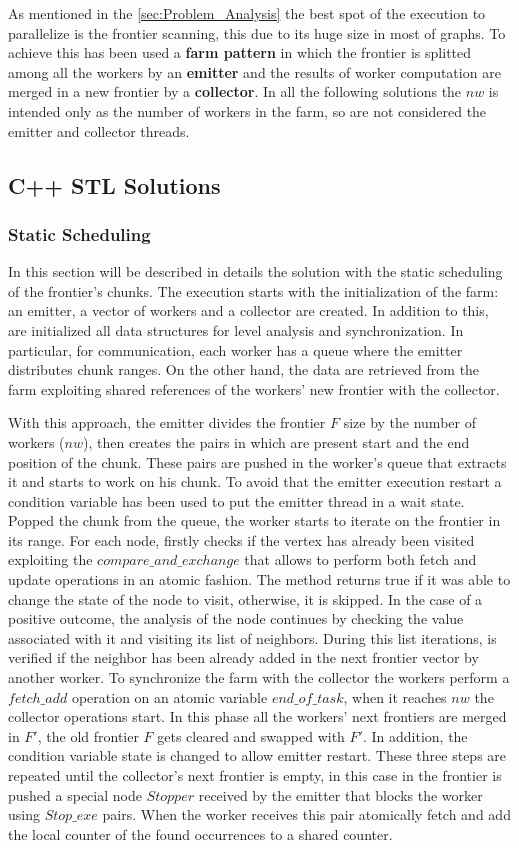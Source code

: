 As mentioned in the \ref{sec:Problem_Analysis} the best spot of the execution to parallelize is the frontier scanning, this due to its huge size in most of graphs. To achieve this has been used a \textbf{farm pattern} in which the frontier is splitted among all the workers by an \textbf{emitter} and the results of worker computation are merged in a new frontier by a \textbf{collector}.
In all the following solutions the $nw$ is intended only as the number of workers in the farm, so are not considered the emitter and collector threads.
\subsection{C++ STL Solutions}
\label{subsec:CStatic}
\subsubsection{Static Scheduling}
In this section will be described in details the solution with the static scheduling of the frontier's chunks.
The execution starts with the initialization of the farm: an emitter, a vector of workers and a collector are created. In addition to this, are initialized all data structures for level analysis and synchronization. In particular, for communication, each worker has a queue where the emitter distributes chunk ranges. On the other hand, the data are retrieved from the farm exploiting shared references of the workers' new frontier with the collector.

With this approach, the emitter divides the frontier $F$ size by the number of workers ($nw$), then creates the pairs in which are present start and the end position of the chunk. These pairs are pushed in the worker's queue that extracts it and starts to work on his chunk. To avoid that the emitter execution restart a condition variable has been used to put the emitter thread in a wait state. 
Popped the chunk from the queue, the worker starts to iterate on the frontier in its range. For each node, firstly checks if the vertex has already been visited exploiting the $compare\_and\_exchange$ that allows to perform both fetch and update operations in an atomic fashion. The method returns true if it was able to change the state of the node to visit, otherwise, it is skipped.
In the case of a positive outcome, the analysis of the node continues by checking the value associated with it and visiting its list of neighbors. During this list iterations, is verified if the neighbor has been already added in the next frontier vector by another worker.
To synchronize the farm with the collector the workers perform a $fetch\_add$ operation on an atomic variable $end\_of\_task$, when it reaches $nw$ the collector operations start. In this phase all the workers' next frontiers are merged in $F'$, the old frontier $F$ gets cleared and swapped with $F'$. In addition, the condition variable state is changed to allow emitter restart. These three steps are repeated until the collector's next frontier is empty, in this case in the frontier is pushed a special node $Stopper$ received by the emitter that blocks the worker using $Stop\_exe$ pairs. When the worker receives this pair atomically fetch and add the local counter of the found occurrences to a shared counter.

